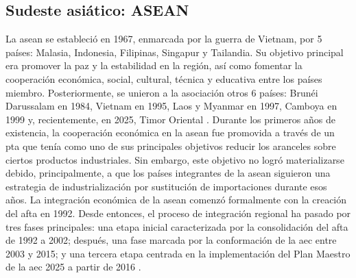 \clearpage
\subsection{Sudeste asiático: ASEAN}

La \acrfull{asean} se estableció en 1967, enmarcada por la guerra de Vietnam, por 5 países: Malasia, Indonesia, Filipinas, Singapur y Tailandia. Su objetivo principal era promover la paz y la estabilidad en la región, así como fomentar la cooperación económica, social, cultural, técnica y educativa entre los países miembro. Posteriormente, se unieron a la asociación otros 6 países: Brunéi Darussalam en 1984, Vietnam en 1995, Laos y Myanmar en 1997, Camboya en 1999 y, recientemente, en 2025, Timor Oriental \parencite{ASEAN}. Durante los primeros años de existencia, la cooperación económica en la \gls{asean} fue promovida a través de un \gls{pta} que tenía como uno de sus principales objetivos reducir los aranceles sobre ciertos productos industriales. Sin embargo, este objetivo no logró materializarse debido, principalmente, a que los países integrantes de la \gls{asean} siguieron una estrategia de industrialización por sustitución de importaciones durante esos años. La integración económica de la \gls{asean} comenzó formalmente con la creación del \gls{afta} en 1992. Desde entonces, el proceso de integración regional ha pasado por tres fases principales: una etapa inicial caracterizada por la consolidación del \gls{afta} de 1992 a 2002; después, una fase marcada por la conformación de la \gls{aec} entre 2003 y 2015; y una tercera etapa centrada en la implementación del Plan Maestro de la \gls{aec} 2025 a partir de 2016 \parencite[pp.~25--26]{Ishikawa2021}.


